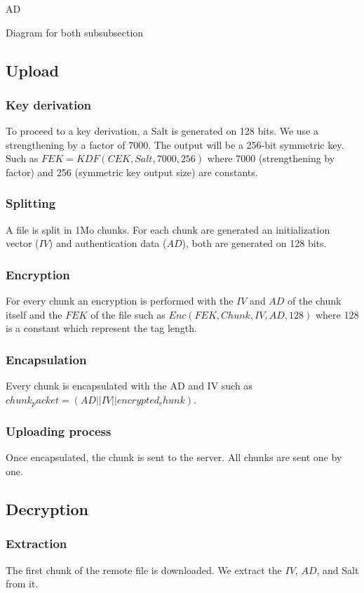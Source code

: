 AD\documentclass[a4paper,10pt]{article}
\begin{document}
Diagram for both subsubsection

\subsection{Upload}
\subsubsection{Key derivation}
To proceed to a key derivation, a Salt is generated on 128 bits. We use a strengthening by a factor of 7000. The output will be a 256-bit symmetric key. Such as $FEK = KDF(CEK, Salt, 7000, 256)$ where 7000 (strengthening by factor) and 256 (symmetric key output size) are constants.

\subsubsection{Splitting}
A file is split in 1Mo chunks. For each chunk are generated an initialization vector ($IV$) and authentication data  ($AD$), both are generated on 128 bits.

\subsubsection{Encryption}
For every chunk an encryption is performed with the $IV$ and $AD$ of the chunk itself and the $FEK$ of the file such as $Enc(FEK, Chunk, IV, AD, 128)$ where 128 is a constant which represent the tag length.

\subsubsection{Encapsulation}
Every chunk is encapsulated with the AD and IV such as $chunk_packet=(AD||IV||encrypted_chunk)$.

\subsubsection{Uploading process}
Once encapsulated, the chunk is sent to the server. All chunks are sent one by one.



\subsection{Decryption}
\subsubsection{Extraction}
The first chunk of the remote file is downloaded. We extract the $IV$, $AD$, and Salt from it.
\end{document}
